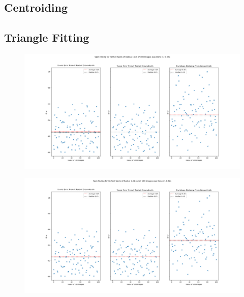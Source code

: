 \documentclass[aps,pra,a4paper,nofootinbib,onecolumn,tightenlines,longbibliography,12pt,amsfonts,amssymb,amsmath,floatfix]{revtex4-2} %
\begin{document}
  \subsection{Centroiding} %
  \label{sub:Centroiding_results}
  
  \subsection{Triangle Fitting} %
  \label{sub:Triangle Fitting}
  
    \begin{figure}[H]
      \begin{center}
        \includegraphics[width=1.0\textwidth]{project_pics/error_r1.png}
      \end{center}
      \caption{}
      \label{fig:tri_er_r1}
    \end{figure}
    
    \begin{figure}[H]
      \begin{center}
        \includegraphics[width=1.0\textwidth]{project_pics/error_r141.png}
      \end{center}
      \caption{}
      \label{fig:tri_er_r141}
    \end{figure}
    
\end{document}
